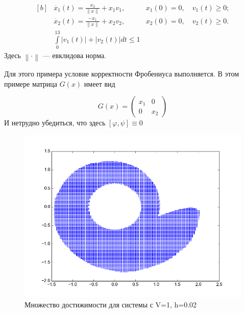 \begin{equation*}
  \begin{aligned}[b]
    &\dot{x_1}(t) = \frac{x_2}{\left\|x\right\|} + x_1v_1, &x_1(0) =
    0,\quad v_1(t) \ge 0;\\
    &\dot{x_2}(t) = \frac{-x_1}{\left\|x\right\|} + x_2v_2, &x_2(0)
    = 0,\quad v_2(t) \ge 0.\\
    &\int\limits_0^{13} |v_1(t)| + |v_2(t)| dt \le 1
  \end{aligned}
\end{equation*}
Здесь $\left\| \cdot \right\|$ --- евклидова норма.

Для этого примера условие корректности
Фробениуса выполняется. 
В этом примере матрица $G(x)$ имеет вид 

\begin{equation*}
  G(x) = 
  \begin{pmatrix}
    x_1 & 0 \\
    0 & x_2
  \end{pmatrix}
\end{equation*}
И нетрудно убедиться, что здесь   $[\varphi,\psi] \equiv 0$


\begin{figure}[h]
\centering
  \noindent \hfil
  \includegraphics[width=1\linewidth]{img/figure_d_h_001_ht_01}
  \hfil \caption{Множество достижимости для системы с V=1, h=0.02}
  \label{fig:v1h0.02}
\end{figure}


